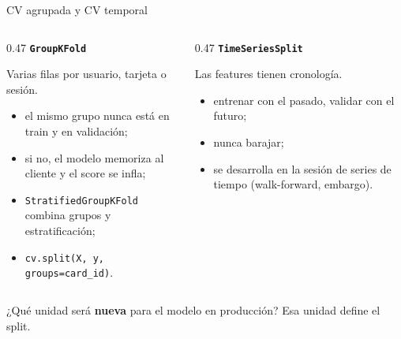\documentclass[aspectratio=169,12pt]{beamer}
\newcommand{\colhead}[1]{\textbf{#1}\par\vspace{2pt}}
\begin{document}
\begin{frame}{CV agrupada y CV temporal}
  \begin{columns}[T]
    \begin{column}{0.47\textwidth}
      \colhead{\texttt{GroupKFold}}
      \footnotesize Varias filas por usuario, tarjeta o sesión.
      \begin{itemize}
        \item el mismo grupo nunca está en train y en validación;
        \item si no, el modelo memoriza al cliente y el score se infla;
        \item \texttt{StratifiedGroupKFold} combina grupos y estratificación;
        \item \texttt{cv.split(X, y, groups=card\_id)}.
      \end{itemize}
    \end{column}
    \begin{column}{0.47\textwidth}
      \colhead{\texttt{TimeSeriesSplit}}
      \footnotesize Las features tienen cronología.
      \begin{itemize}
        \item entrenar con el pasado, validar con el futuro;
        \item nunca barajar;
        \item se desarrolla en la sesión de series de tiempo (walk-forward, embargo).
      \end{itemize}
    \end{column}
  \end{columns}
  \vspace{4pt}
  \begin{keybox}
    ¿Qué unidad será \textbf{nueva} para el modelo en producción? Esa unidad define el split.
  \end{keybox}
\end{frame}
\end{document}
